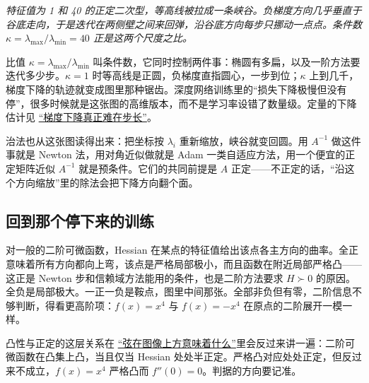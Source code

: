 \begin{center}

\emph{特征值为 1 和 40 的正定二次型，等高线被拉成一条峡谷。负梯度方向几乎垂直于谷底走向，于是迭代在两侧壁之间来回弹，沿谷底方向每步只挪动一点点。条件数 \(\kappa=\lambda_{\max}/\lambda_{\min}=40\) 正是这两个尺度之比。}
\end{center}

比值 \(\kappa=\lambda_{\max}/\lambda_{\min}\) 叫条件数，它同时控制两件事：椭圆有多扁，以及一阶方法要迭代多少步。\(\kappa=1\) 时等高线是正圆，负梯度直指圆心，一步到位；\(\kappa\) 上到几千，梯度下降的轨迹就变成图里那种锯齿。深度网络训练里的``损失下降极慢但没有停''，很多时候就是这张图的高维版本，而不是学习率设错了数量级。定量的下降估计见 \hyperref[sec:09-Convex-Optimization/06-Optimization-Algorithms/01]{``梯度下降真正难在步长''}。

治法也从这张图读得出来：把坐标按 \(\lambda_i\) 重新缩放，峡谷就变回圆。用 \(A^{-1}\) 做这件事就是 Newton 法，用对角近似做就是 Adam 一类自适应方法，用一个便宜的正定矩阵近似 \(A^{-1}\) 就是预条件。它们的共同前提是 \(A\) 正定——不正定的话，``沿这个方向缩放''里的除法会把下降方向翻个面。

\subsection{回到那个停下来的训练}

对一般的二阶可微函数，Hessian 在某点的特征值给出该点各主方向的曲率。全正意味着所有方向都向上弯，该点是严格局部极小，而且函数在附近局部严格凸——这正是 Newton 步和信赖域方法能用的条件，也是二阶方法要求 \(H\succ0\) 的原因。全负是局部极大。一正一负是鞍点，图里中间那张。全部非负但有零，二阶信息不够判断，得看更高阶项：\(f(x)=x^4\) 与 \(f(x)=-x^4\) 在原点的二阶展开一模一样。

凸性与正定的这层关系在 \hyperref[sec:09-Convex-Optimization/03-Convex-Functions/01]{``弦在图像上方意味着什么''}里会反过来讲一遍：二阶可微函数在凸集上凸，当且仅当 Hessian 处处半正定。严格凸对应处处正定，但反过来不成立，\(f(x)=x^4\) 严格凸而 \(f''(0)=0\)。判据的方向要记准。

